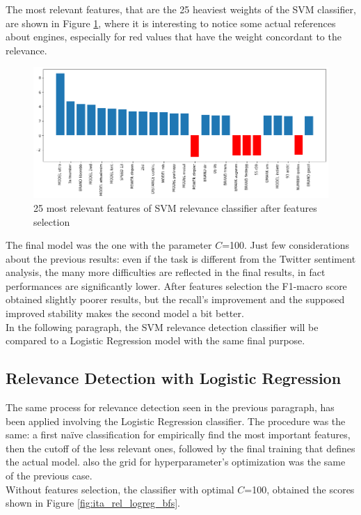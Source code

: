 The most relevant features, that are the 25 heaviest weights of the SVM classifier, are shown in Figure \ref{fig:ita_rel_svm_feat}, where it is interesting to notice some actual references about engines, especially for red values that have the weight concordant to the relevance.

\begin{figure}[H]
	\centering
	\includegraphics[width=\textwidth]{figures/conf_matrices/ita_rel_svm/svm_rel_best_feat.png}
	\caption{25 most relevant features of SVM relevance classifier after features selection}
	\label{fig:ita_rel_svm_feat}
\end{figure}

The final model was the one with the parameter $C$=100. Just few considerations about the previous results: even if the task is different from the Twitter sentiment analysis, the many more difficulties are reflected in the final results, in fact performances are significantly lower. After features selection the F1-macro score obtained slightly poorer results, but the recall's improvement and the supposed improved stability makes the second model a bit better.\\
In the following paragraph, the SVM relevance detection classifier will be compared to a Logistic Regression model with the same final purpose.


\subsection{Relevance Detection with Logistic Regression}

The same process for relevance detection seen in the previous paragraph, has been applied involving the Logistic Regression classifier. The procedure was the same: a first na{\"i}ve classification for empirically find the most important features, then the cutoff of the less relevant ones, followed by the final training that defines the actual model. also the grid for hyperparameter's optimization was the same of the previous case.\\
Without features selection, the classifier with optimal $C$=100, obtained the scores shown in Figure \ref{fig:ita_rel_logreg_bfs}.

